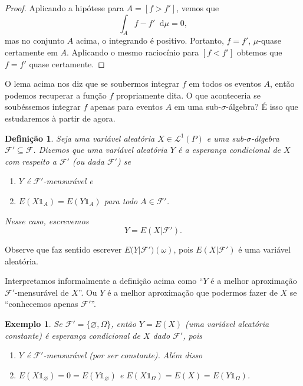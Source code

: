 \documentclass[reqno]{article}
\newcommand*\1{\mathds{1}}
\newtheorem{definition}[theorem]{Definição}
\newtheorem{example}{Exemplo}[section]
\renewcommand*\d{\mathop{}\!\mathrm{d}}
\begin{document}
\begin{proof}
  Aplicando a hipótese para $A = [f > f']$, vemos que
  \begin{equation}
    \int_A f - f' \d \mu = 0,
  \end{equation}
  mas no conjunto $A$ acima, o integrando é positivo.
  Portanto, $f = f'$, $\mu$-quase certamente em $A$.
  Aplicando o mesmo raciocínio para $[f < f']$ obtemos que $f = f'$ quase certamente.
\end{proof}

O lema acima nos diz que se soubermos integrar $f$ em todos os eventos $A$, então podemos recuperar a função $f$ propriamente dita.
O que aconteceria se soubéssemos integrar $f$ apenas para eventos $A$ em uma sub-$\sigma$-álgebra?
É isso que estudaremos à partir de agora.

\begin{definition}
  \label{d:esperanca_condicional}
  Seja uma variável aleatória $X \in \mathcal{L}^1(P)$ e uma sub-$\sigma$-álgebra $\mathcal{F}' \subseteq \mathcal{F}$.
  Dizemos que uma variável aleatória $Y$ é a esperança condicional de $X$ com respeito a $\mathcal{F}'$ (ou dada $\mathcal{F}'$) se
  \begin{enumerate}[\quad a)]
  \item $Y$ é $\mathcal{F}'$-mensurável e
  \item $E(X \1_{A}) = E(Y \1_{A})$ para todo $A \in \mathcal{F}'$.
  \end{enumerate}
  Nesse caso, escrevemos
  \begin{equation}
    Y = E(X | \mathcal{F}').
  \end{equation}
\end{definition}

Observe que faz sentido escrever $E\big(Y|\mathcal{F}'\big)(\omega)$, pois $E(X|\mathcal{F}')$ é uma variável aleatória.

Interpretamos informalmente a definição acima como ``$Y$ é a melhor aproximação $\mathcal{F}'$-mensurável de $X$''.
Ou $Y$ é a melhor aproximação que podermos fazer de $X$ se ``conhecemos apenas $\mathcal{F}'$''.

\begin{example}
  \label{x:EXF_trivial}
  Se $\mathcal{F}' = \{\varnothing, \Omega\}$, então $Y = E(X)$ (uma variável aleatória constante) é esperança condicional de $X$ dado $\mathcal{F}'$, pois
  \begin{enumerate}[\quad a)]
  \item $Y$ é $\mathcal{F}'$-mensurável (por ser constante). Além disso
  \item $E(X \1_\varnothing) = 0 = E(Y \1_\varnothing)$ e $E(X \1_\Omega) = E(X) = E(Y \1_\Omega)$.
  \end{enumerate}
\end{example}
\end{document}
